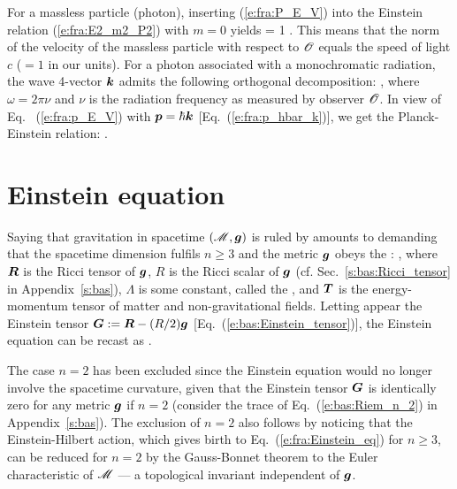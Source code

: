 For a massless particle (photon), inserting (\ref{e:fra:P_E_V}) into the
Einstein relation (\ref{e:fra:E2_m2_P2}) with $m=0$ yields
\be \label{e:fra:photon_V_one}
    \cdot{} = 1 .
\ee
This means that the norm of the velocity of the massless particle with respect to $\mathscr{O}$
equals the speed of light $c$ ($=1$ in our units).
For a photon associated with a monochromatic radiation, the wave 4-vector $\bm{k}$
admits the following orthogonal decomposition:
\be
   ,
\ee
where $\omega = 2\pi \nu$ and $\nu$ is the radiation frequency as measured by
observer $\mathscr{O}$. In view of Eq.~ (\ref{e:fra:p_E_V}) with $\bm{p} = \hbar\bm{k}$
[Eq.~(\ref{e:fra:p_hbar_k})], we
get the Planck-Einstein relation:
\be \label{e:fra:Planck_Einstein}
    .
\ee

\section{Einstein equation} \label{s:fra:Einstein_eq}

Saying that gravitation in spacetime $(\mathscr{M}, \bm{g})$ is ruled by
 amounts
to demanding that the spacetime dimension fulfils $n\geq 3$ and
the metric $\bm{g}$ obeys the :
\be \label{e:fra:Einstein_eq}
    ,
\ee
where $\bm{R}$ is the Ricci tensor of $\bm{g}$, $R$ is the
Ricci scalar of $\bm{g}$
(cf. Sec.~\ref{s:bas:Ricci_tensor} in Appendix~\ref{s:bas}), $\Lambda$ is some
constant, called the ,
and $\bm{T}$ is the energy-momentum tensor of
matter and non-gravitational fields. Letting appear the
Einstein tensor $\bm{G} := \bm{R} - (R/2) \bm{g}$
[Eq.~(\ref{e:bas:Einstein_tensor})], the Einstein equation can be recast as
\be \label{e:fra:Einstein_eq_G}
    .
\ee

\begin{remark} \label{r:fra:Einstein_eq_n_2}
The case $n=2$ has been excluded since the Einstein equation would
no longer involve the spacetime curvature, given that the Einstein tensor
$\bm{G}$ is identically zero for any metric $\bm{g}$ if $n=2$
(consider the trace of Eq.~(\ref{e:bas:Riem_n_2}) in Appendix~\ref{s:bas}).
The exclusion of $n=2$ also follows by noticing that
the Einstein-Hilbert action,
which gives birth to Eq.~(\ref{e:fra:Einstein_eq})
for $n\geq 3$, can be reduced for $n=2$
by the Gauss-Bonnet theorem to the
Euler characteristic
of $\mathscr{M}$ --- a topological invariant independent of $\bm{g}$.
\end{remark}

